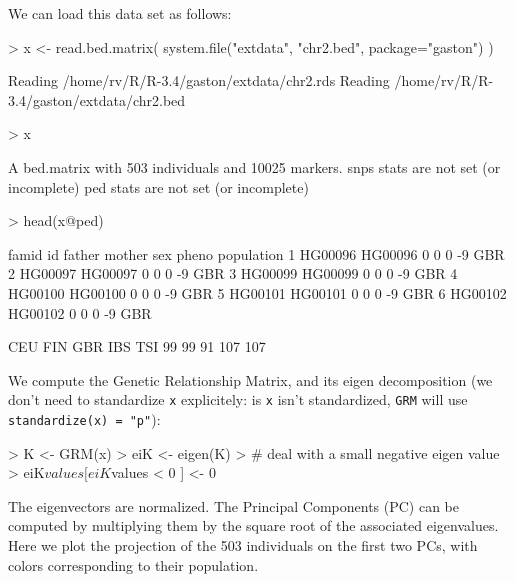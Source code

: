 \documentclass{article}
\renewenvironment{Schunk}{\vspace{\topsep}}{\vspace{\topsep}}
\begin{document}
  We can load this data set as follows:
\begin{Schunk}
\begin{Sinput}
> x <- read.bed.matrix( system.file("extdata", "chr2.bed", package="gaston") )
\end{Sinput}
\begin{Soutput}
Reading /home/rv/R/R-3.4/gaston/extdata/chr2.rds 
Reading /home/rv/R/R-3.4/gaston/extdata/chr2.bed 
\end{Soutput}
\begin{Sinput}
> x
\end{Sinput}
\begin{Soutput}
A bed.matrix with 503 individuals and 10025 markers.
snps stats are not set (or incomplete)
ped stats are not set (or incomplete)
\end{Soutput}
\begin{Sinput}
> head(x@ped)
\end{Sinput}
\begin{Soutput}
    famid      id father mother sex pheno population
1 HG00096 HG00096      0      0   0    -9        GBR
2 HG00097 HG00097      0      0   0    -9        GBR
3 HG00099 HG00099      0      0   0    -9        GBR
4 HG00100 HG00100      0      0   0    -9        GBR
5 HG00101 HG00101      0      0   0    -9        GBR
6 HG00102 HG00102      0      0   0    -9        GBR
\end{Soutput}
\begin{Soutput}
CEU FIN GBR IBS TSI 
 99  99  91 107 107 
\end{Soutput}
\end{Schunk}


We compute the Genetic Relationship Matrix, and its eigen decomposition (we don't
need to standardize \verb!x! explicitely: is \verb!x! isn't standardized, 
\verb!GRM! will use \verb!standardize(x) = "p"!):
\begin{Schunk}
\begin{Sinput}
> K <- GRM(x)
> eiK <- eigen(K)
> # deal with a small negative eigen value
> eiK$values[ eiK$values < 0 ] <- 0
\end{Sinput}
\end{Schunk}

  The eigenvectors are normalized. The Principal Components (PC) can be computed by 
  multiplying them by the square root of the associated eigenvalues. Here we plot
  the projection of the 503 individuals on the first two PCs, with colors corresponding
  to their population.
\end{document}
